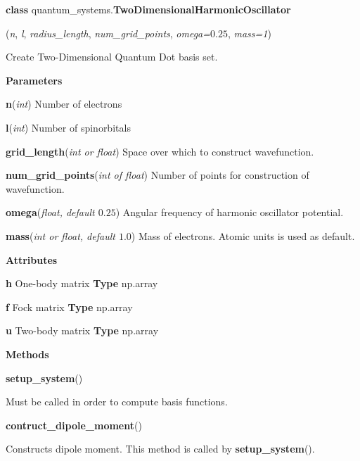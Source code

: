 
\begin{tcolorbox}
    {\selectfont
    \textbf{class} quantum\_systems.\textbf{TwoDimensionalHarmonicOscillator}

    \hspace{1em}(\emph{n}, \emph{l}, \emph{radius\_length}, \emph{num\_grid\_points}, 
    \emph{omega=$0.25$}, \emph{mass=1})

    \vspace{1em}
    Create Two-Dimensional Quantum Dot basis set.
    \vspace{1em}

    \textbf{Parameters}

    \hspace{2em}\textbf{n}(\emph{int}) Number of electrons
    
    \hspace{2em}\textbf{l}(\emph{int}) Number of spinorbitals
    
    \hspace{2em}\textbf{grid\_length}(\emph{int or float}) Space over which to 
        construct wavefunction.
    
    \hspace{2em}\textbf{num\_grid\_points}(\emph{int of float}) Number of 
        points for construction of wavefunction.

    \hspace{2em}\textbf{omega}(\emph{float, default $0.25$}) Angular frequency of
        harmonic oscillator potential.
    
    \hspace{2em}\textbf{mass}(\emph{int or float, default $1.0$}) Mass of electrons.
        Atomic units is used as default.

    \vspace{1em}
    \textbf{Attributes}

    \hspace{2em} \textbf{h}
    One-body matrix 
    \textbf{Type} np.array
    
    \hspace{2em} \textbf{f}
    Fock matrix
    \textbf{Type} np.array

    \hspace{2em} \textbf{u}
    Two-body matrix
    \textbf{Type} np.array

    \vspace{1em}
    \textbf{Methods}

    \hspace{2em} \textbf{setup\_system}()
        \begin{adjustwidth}{4em}{}
        Must be called in order to compute basis functions.           
        \end{adjustwidth}
   
    \hspace{2em} \textbf{contruct\_dipole\_moment}()
        \begin{adjustwidth}{4em}{}
        Constructs dipole moment. This method is called by
        \textbf{setup\_system}().
        \end{adjustwidth}
    }
\end{tcolorbox}

